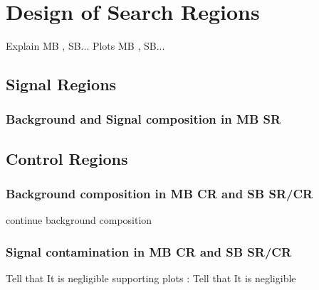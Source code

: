 \chapter{Design of Search Regions}
Explain MB , SB...  
\newpage
Plots MB , SB...  
\section{Signal Regions}
\subsection{Background and Signal composition in MB SR}
\newpage
\section{Control Regions}
\subsection{Background composition in MB CR and SB SR/CR}
\newpage
continue background composition
\newpage
\subsection{Signal contamination in MB CR and SB SR/CR}
Tell that It is negligible
\newpage
supporting plots : Tell that It is negligible
